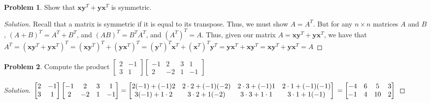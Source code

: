 \documentclass[oneside]{book}
\theoremstyle{definition}
\newtheorem{problem}{Problem}[section]
\newcommand*\B[1]{\mathbf{#1}}
\begin{document}
\begin{problem}
Show that $\B{x}\B{y}^T + \B{y}\B{x}^T$ is symmetric.
\end{problem}
\begin{proof}[Solution]
Recall that a matrix is symmetric if it is equal to its transpose. Thus, we must show $A = A^T$. But for any $n\times n$ matrices $A$ and $B$, $(A+B)^T = A^T + B^T$, and $(AB)^T = B^T A^T$, and $(A^T)^T = A$. Thus, given our matrix $A= \B{x}\B{y}^T + \B{y}\B{x}^T$, we have that $A^T = (\B{x}\B{y}^T + \B{y}\B{x}^T)^T = (\B{x}\B{y}^T)^T + (\B{y}\B{x}^T)^T = (\B{y}^T)^T\B{x}^T + (\B{x}^T)^T\B{y}^T = \B{y}\B{x}^T + \B{x}\B{y}^T = \B{x}\B{y}^T + \B{y}\B{x}^T = A$
\end{proof}

\begin{problem}
Compute the product $\begin{bmatrix} 2 & -1 \\ 3 & 1\end{bmatrix} \begin{bmatrix} -1 & 2 & 3 & 1 \\ 2 & -2 & 1 & -1 \end{bmatrix}$
\end{problem}
\begin{proof}[Solution]
$\begin{bmatrix} 2 & -1 \\ 3 & 1\end{bmatrix} \begin{bmatrix} -1 & 2 & 3 & 1 \\ 2 & -2 & 1 & -1 \end{bmatrix}=\begin{bmatrix} 2(-1)+(-1)2 & 2\cdot 2 + (-1)(-2) & 2\cdot 3 + (-1)1 & 2\cdot 1 + (-1)(-1) \\ 3(-1)+1\cdot 2 & 3\cdot 2 + 1(-2) & 3\cdot 3 + 1\cdot 1 & 3\cdot 1 + 1(-1)\end{bmatrix}\\ =\begin{bmatrix} -4 & 6 & 5 &3 \\ -1 & 4 & 10 & 2\end{bmatrix}$
\end{proof}
\end{document}
